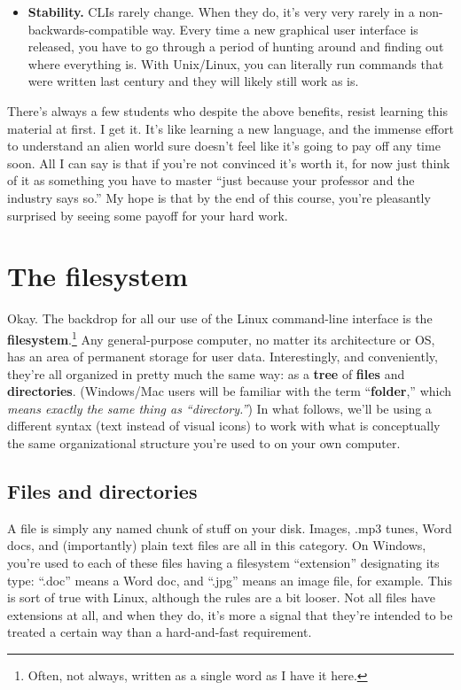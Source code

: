 \begin{itemize}
\item \textbf{Stability.} CLIs rarely change. When they do, it's very very
rarely in a non-backwards-compatible way. Every time a new graphical user
interface is released, you have to go through a period of hunting around and
finding out where everything is. With Unix/Linux, you can literally run
commands that were written last century and they will likely still work as is.

\end{itemize}

There's always a few students who despite the above benefits, resist learning
this material at first. I get it. It's like learning a new language, and the
immense effort to understand an alien world sure doesn't feel like it's going
to pay off any time soon. All I can say is that if you're not convinced it's
worth it, for now just think of it as something you have to master ``just
because your professor and the industry says so.'' My hope is that by the end
of this course, you're pleasantly surprised by seeing some payoff for your
hard work.


\section{The filesystem}

Okay. The backdrop for all our use of the Linux command-line interface is the
\textbf{filesystem}.\footnote{Often, not always, written as a single word as I
have it here.} Any general-purpose computer, no matter its architecture or OS,
has an area of permanent storage for user data. Interestingly, and
conveniently, they're all organized in pretty much the same way: as a
\textbf{tree} of \textbf{files} and \textbf{directories}. (Windows/Mac users
will be familiar with the term ``\textbf{folder},'' which \textit{means exactly
the same thing as ``directory.''}) In what follows, we'll be using a different
syntax (text instead of visual icons) to work with what is conceptually the
same organizational structure you're used to on your own computer.

\subsection{Files and directories}

A file is simply any named chunk of stuff on your disk. Images, .mp3 tunes,
Word docs, and (importantly) plain text files are all in this category. On
Windows, you're used to each of these files having a filesystem ``extension''
designating its type: ``.doc'' means a Word doc, and ``.jpg'' means an image
file, for example. This is sort of true with Linux, although the rules are
a bit looser. Not all files have extensions at all, and when they do, it's
more a signal that they're intended to be treated a certain way than a
hard-and-fast requirement.

